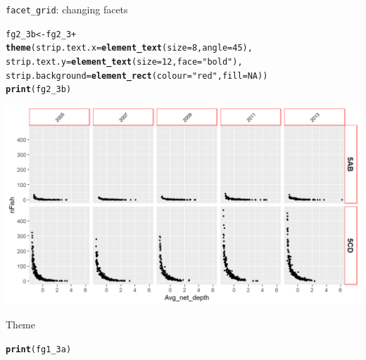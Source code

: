 \documentclass{beamer}\usepackage[]{graphicx}\usepackage[]{color}
\makeatletter
\newcommand{\hlnum}[1]{\textcolor[rgb]{0.686,0.059,0.569}{#1}}%
\newcommand{\hlstr}[1]{\textcolor[rgb]{0.192,0.494,0.8}{#1}}%
\newcommand{\hlopt}[1]{\textcolor[rgb]{0,0,0}{#1}}%
\newcommand{\hlstd}[1]{\textcolor[rgb]{0.345,0.345,0.345}{#1}}%
\newcommand{\hlkwb}[1]{\textcolor[rgb]{0.69,0.353,0.396}{#1}}%
\newcommand{\hlkwc}[1]{\textcolor[rgb]{0.333,0.667,0.333}{#1}}%
\newcommand{\hlkwd}[1]{\textcolor[rgb]{0.737,0.353,0.396}{\textbf{#1}}}%
\newenvironment{kframe}{%
 \def\at@end@of@kframe{}%
 \ifinner\ifhmode%
  \def\at@end@of@kframe{\end{minipage}}%
  \begin{minipage}{\columnwidth}%
 \fi\fi%
 \def\FrameCommand##1{\hskip\@totalleftmargin \hskip-\fboxsep
 \colorbox{shadecolor}{##1}\hskip-\fboxsep
     \hskip-\linewidth \hskip-\@totalleftmargin \hskip\columnwidth}%
 \MakeFramed {\advance\hsize-\width
   \@totalleftmargin\z@ \linewidth\hsize
   \@setminipage}}%
 {\par\unskip\endMakeFramed%
 \at@end@of@kframe}
\newenvironment{knitrout}{}{} %
\makeatother
\begin{document}
\begin{frame}[fragile]{\lstinline{facet_grid}: changing facets}
\begin{knitrout}\footnotesize
{}\color{fgcolor}\begin{kframe}
\begin{alltt}
\hlstd{fg2_3b} \hlkwb{<-} \hlstd{fg2_3} \hlopt{+}
    \hlkwd{theme}\hlstd{(}\hlkwc{strip.text.x} \hlstd{=} \hlkwd{element_text}\hlstd{(}\hlkwc{size}\hlstd{=}\hlnum{8}\hlstd{,} \hlkwc{angle}\hlstd{=}\hlnum{45}\hlstd{),}
          \hlkwc{strip.text.y} \hlstd{=} \hlkwd{element_text}\hlstd{(}\hlkwc{size}\hlstd{=}\hlnum{12}\hlstd{,} \hlkwc{face}\hlstd{=}\hlstr{"bold"}\hlstd{),}
          \hlkwc{strip.background} \hlstd{=} \hlkwd{element_rect}\hlstd{(}\hlkwc{colour}\hlstd{=}\hlstr{"red"}\hlstd{,} \hlkwc{fill}\hlstd{=}\hlnum{NA}\hlstd{))}
\hlkwd{print}\hlstd{(fg2_3b)}
\end{alltt}
\end{kframe}

{\centering \includegraphics[width=.9\linewidth]{figure/facet_grid_10-1} 

}



\end{knitrout}
\end{frame}

\begin{frame}[fragile]{Theme}
\begin{knitrout}\footnotesize
{}\color{fgcolor}\begin{kframe}
\begin{alltt}
\hlkwd{print}\hlstd{(fg1_3a)}
\end{alltt}


{\ttfamily\noindent\bfseries\color{errorcolor}{\#\# Error in print(fg1\_3a): object 'fg1\_3a' not found}}\end{kframe}
\end{knitrout}
\end{frame}
\end{document}
